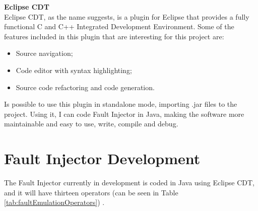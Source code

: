 \textbf{Eclipse CDT}\\

Eclipse CDT, as the name suggests, is a plugin for Eclipse that provides a fully functional C and C++ Integrated Development Environment.
Some of the features included in this plugin that are interesting for this project are:
\begin{itemize}
	\item Source navigation;
	\item Code editor with syntax highlighting;
	\item Source code refactoring and code generation.
\end{itemize}

Is possible to use this plugin in standalone mode, importing .jar files to the project.
Using it, I can code Fault Injector in Java, making the software more maintainable and easy to use, write, compile and debug.
\\





\newpage
\section{Fault Injector Development}

The Fault Injector currently in development is coded in Java using Eclipse CDT, and it will have thirteen operators (can be seen in Table \ref{tab:faultEmulationOperators})
\cite{duraes2005thesis}.

